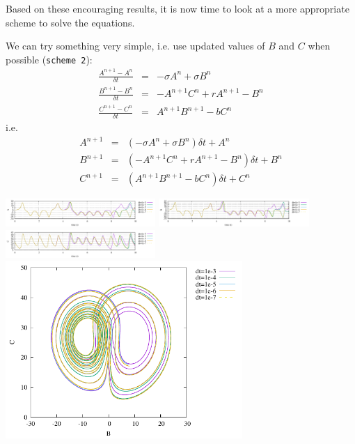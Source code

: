 Based on these encouraging results, it is now time to look at a more appropriate
scheme to solve the equations.

We can try something very simple, i.e. use updated values of $B$ and $C$ when possible ({\tt scheme 2}):
\begin{eqnarray}
\frac{A^{n+1}-A^n}{\delta t} &=& -\sigma A^n + \sigma B^n \\
\frac{B^{n+1}-B^n}{\delta t} &=& -A^{n+1} C^n + rA^{n+1} -B^n  \\
\frac{C^{n+1}-C^n}{\delta t} &=& A^{n+1} B^{n+1} - bC^n \label{eq:Lorenz3}
\end{eqnarray}
i.e.
\begin{eqnarray}
A^{n+1} &=& (-\sigma A^n + \sigma B^n) \delta t + A^n \\
B^{n+1} &=& (-A^{n+1} C^n + rA^{n+1} -B^n ) \delta t+ B^n \\
C^{n+1} &=& (A^{n+1} B^{n+1} - bC^n ) \delta t + C^n
\end{eqnarray}

\begin{center}
\includegraphics[width=5.7cm]{python_codes/fieldstone_156/results/scheme2/A.pdf}
\includegraphics[width=5.7cm]{python_codes/fieldstone_156/results/scheme2/B.pdf}
\includegraphics[width=5.7cm]{python_codes/fieldstone_156/results/scheme2/C.pdf}\\
\includegraphics[width=9cm]{python_codes/fieldstone_156/results/scheme2/BC.pdf}\\
\end{center}

